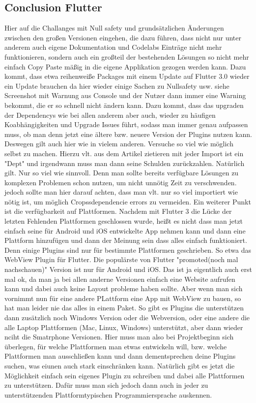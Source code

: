 \subsection{Conclusion Flutter}
Hier auf die Challanges mit Null safety und grundsätzlichen Änderungen zwischen den großen Versionen eingehen, die dazu führen, dass nicht nur unter anderem auch eigene Dokumentation und Codelabs Einträge nicht mehr funktionieren, sondern auch ein großteil der bestehenden Lösungen so nicht mehr einfach Copy Paste mäßig in die eigene Applikation gezogen werden kann.
Dazu kommt, dass etwa reihenweiße Packages mit einem Update auf Flutter 3.0 wieder ein Update brauchen da hier wieder einige Sachen zu Nullsafety usw. siehe Screenshot mit Warnung aus Console und der Nutzer dann immer eine Warning bekommt, die er so schnell nicht ändern kann. Dazu kommt, dass das upgraden der Dependencys wie bei allen anderem aber auch, wieder zu häufigen Koabhängigkeiten und Upgrade Issues führt, sodass man immer genau aufpassen muss, ob man denn jetzt eine ältere bzw. neuere Version der Plugins nutzen kann. Deswegen gilt auch hier wie in vielem anderen. Versuche so viel wie möglich selbst zu machen. Hierzu vlt. aus dem Artikel zietieren mit jeder Import ist ein "Dept" und irgendwann muss man dann seine Schulden zurückzahlen. Natürlich gilt. Nur so viel wie sinnvoll. Denn man sollte bereits verfügbare Lösungen zu komplexen Problemen schon nutzen, um nicht unnötig Zeit zu verschwenden. jedoch sollte man hier darauf achten, dass man vlt. nur so viel importiert wie nötig ist, um möglich Cropssdependencie errors zu vermeiden.
Ein weiterer Punkt ist die verfügbarkeit auf Plattformen. Nachdem mit Flutter 3 die Lücke der letzten Fehlenden Plattformen geschlossen wurde, heißt es nicht dass man jetzt einfach seine für Android und iOS entwickelte App nehmen kann und dann eine Plattform hinzufügen und dann der Meinung sein dass alles einfach funktioniert. Denn einige Plugins sind nur für bestimmte Plattformen geschrieben. So etwa das WebView Plugin für Flutter. Die populärste von Flutter "promoted(noch mal nachschauen)" Version ist nur für Android und iOS. Das ist ja eigentlich auch erst mal ok, da man ja bei allen anderne Versionen einfach eine Website aufrufen kann und dabei auch keine Layout probleme haben sollte. Aber wenn man sich vornimmt nun für eine andere PLattform eine App mit WebView zu bauen, so hat man leider nie das alles in einem Paket. So gibt es Plugins die unterstützen dann zusätzlich noch Windows Version oder die Webversion, oder eine andere die alle Laptop Plattformen (Mac, Linux, Windows) unterstützt, aber dann wieder nciht die Smatrphone Versionen. Hier muss man also bei Projektbeginn sich überlegen, für welche Plattformen man etwas entwickeln will, bzw. welche Plattformen man ausschließen kann und dann dementsprechen deine Plugins suchen, was eiunen auch stark einschränken kann. Natürlich gibt es jetzt die Möglichkeit einfach sein eigenes Plugin zu schreiben und dabei alle Plattformen zu unterstützen. Dafür muss man sich jedoch dann auch in jeder zu unterstützenden Plattformtypischen Programmiersprache auskennen.

